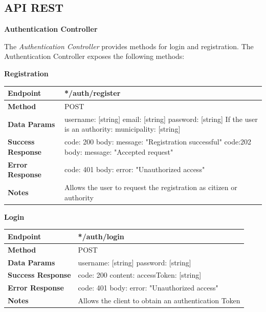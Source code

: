\documentclass{report}
\begin{document}
\subsection{API REST}
\begin{center}\large{\textbf{Authentication Controller}}\end{center}
The \textit{Authentication Controller} provides methods for login and registration.
The Authentication Controller exposes the following methods: \\

\begin{center}{\textbf{Registration}}\end{center}
\begin{tabular}{| l | p{8cm} |}
    \hline
    \textbf{Endpoint} & */auth/register \\
    \hline
    \textbf{Method} & POST \\
    \hline
    \textbf{Data Params} & username: [string] \newline email: [string] \newline password: [string] \newline If the user is an authority: \newline municipality: [string]\\
    \hline
    \textbf{Success Response} & code: 200 \newline body: {message: "Registration successful"} \newline \newline code:202 \newline body: {message: "Accepted request"}\\
    \hline
    \textbf{Error Response} & code: 401 \newline body: {error: "Unauthorized access"} \\
    \hline
    \textbf{Notes} & Allows the user to request the registration as citizen or authority \\
    \hline
\end{tabular}

\begin{center}{\textbf{Login}}\end{center}
\begin{tabular}{| l | p{8cm} |}
	\hline
	\textbf{Endpoint} & */auth/login \\
	\hline
	\textbf{Method} & POST \\
	\hline
	\textbf{Data Params} & username: [string] \newline password: [string]\\
	\hline
	\textbf{Success Response} & code: 200 \newline content: {accessToken: [string]}\\
	\hline
    \textbf{Error Response} & code: 401 \newline body: {error: "Unauthorized access"} \\
	\hline
	\textbf{Notes} & Allows the client to obtain an authentication Token \\
	\hline
\end{tabular}
\end{document}
